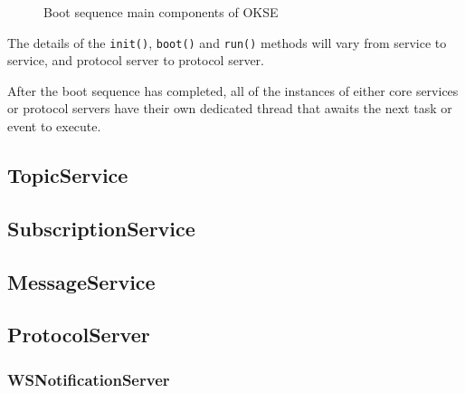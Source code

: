\begin{center}
  \begin{figure}[ht!]
    \caption{Boot sequence main components of OKSE}
    \label{fig:boot-sequence}
  \end{figure}
\end{center}

The details of the \verb!init()!, \verb!boot()! and \verb!run()! methods will vary from service to service, and protocol server to protocol server.

After the boot sequence has completed, all of the instances of either core services or protocol servers have their own dedicated thread that awaits the next task or event to execute.

\subsection{TopicService}

\subsection{SubscriptionService}

\subsection{MessageService}

\subsection{ProtocolServer}
 
\subsubsection{WSNotificationServer}

